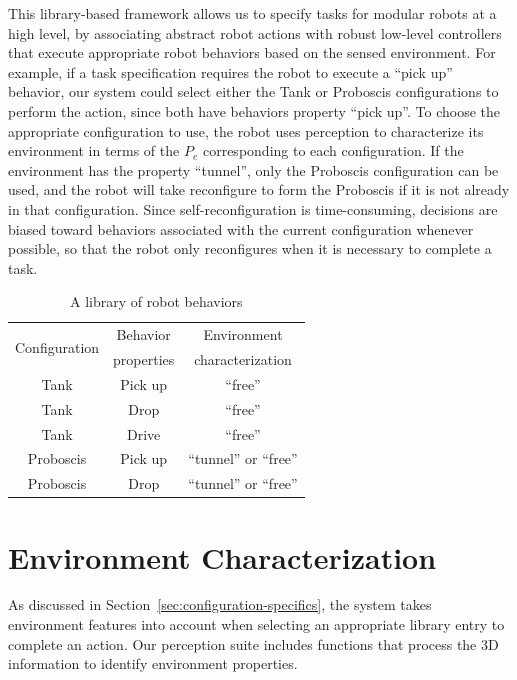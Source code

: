 \documentclass[conference]{IEEEtran}
\begin{document}
This library-based framework allows us to specify tasks for modular robots at a high level, by associating abstract robot actions with robust low-level controllers that execute appropriate robot behaviors based on the sensed environment. For example, if a task specification requires the robot to execute a ``pick up'' behavior, our system could select either the Tank or Proboscis configurations to perform the action, since both have behaviors property ``pick up''. To choose the appropriate configuration to use, the robot uses perception to characterize its environment in terms of the $P_e$ corresponding to each configuration. If the environment has the property ``tunnel'', only the Proboscis configuration can be used, and the robot will take  reconfigure to form the Proboscis if it is not already in that configuration. Since self-reconfiguration is time-consuming, decisions are biased toward behaviors associated with the current configuration whenever possible, so that the robot only reconfigures when it is necessary to complete a task.
%
\begin{table}
\centering
\begin{tabular}{ |c|c|c| } 
 \hline
 \multirow{2}{6em}{Configuration} & Behavior & Environment \\
 & properties & characterization \\
 \hline
 Tank & Pick up & ``free'' \\\hline
 Tank & Drop & ``free'' \\\hline
 Tank & Drive & ``free''\\ \hline
 Proboscis & Pick up & ``tunnel'' or ``free''\\ \hline
 Proboscis & Drop &``tunnel'' or ``free'' \\ 
 \hline
\end{tabular}
\caption{A library of robot behaviors}
\label{table:1}
\vspace{-1em}
\end{table}

%
%

\section{Environment Characterization}
\label{sec:environment-characterization}
%
As discussed in Section~\ref{sec:configuration-specifics}, the system takes environment features into account when selecting an appropriate library entry to complete an action. Our perception suite includes functions that process the 3D information to identify environment properties.
\end{document}
